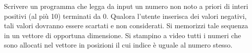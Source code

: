 \begin{Exercise}[label={ex:uguaglianza}]
  Scrivere un programma che legga da input un numero non noto a priori di interi positivi (al più 10) terminati da 0. Qualora l'utente inserisca dei valori negativi, tali valori dovranno essere scartati e non considerati. Si memorizzi tale sequenza in un vettore di opportuna dimensione. Si stampino a video tutti i numeri che sono allocati nel vettore in posizioni il cui indice è uguale al numero stesso.
\end{Exercise}

\begin{Answer}[ref={ex:uguaglianza}]
  
\end{Answer}
